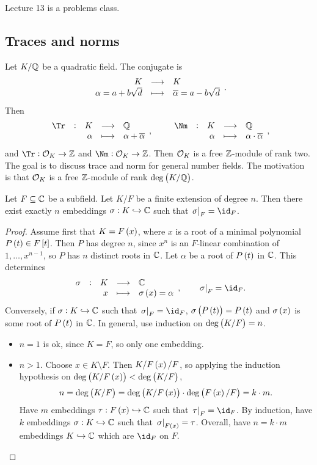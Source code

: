 
Lecture 13 is a problems class.

\subsection{Traces and norms}


Let $ K / \mathbb{Q} $ be a quadratic field. The conjugate is
$$ \function{K}{K}{\alpha = a + b\sqrt{d}}{\overline{\alpha} = a - b\sqrt{d}}. $$
Then
$$ \function[\Tr]{K}{\QQ}{\alpha}{\alpha + \overline{\alpha}}, \qquad \function[\Nm]{K}{\QQ}{\alpha}{\alpha \cdot \overline{\alpha}}, $$
and $ \Tr : \OOO_K \to \ZZ $ and $ \Nm : \OOO_K \to \ZZ $. Then $ \mathcal{O}_K $ is a free $ \mathbb{Z} $-module of rank two. The goal is to discuss trace and norm for general number fields. The motivation is that $ \mathcal{O}_K $ is a free $ \mathbb{Z} $-module of rank $ \deg \br{K / \QQ} $.

\pagebreak

\begin{proposition}
\label{prop:embeddings}
Let $ F \subseteq \mathbb{C} $ be a subfield. Let $ K / F $ be a finite extension of degree $ n $. Then there exist exactly $ n $ embeddings $ \sigma : K \hookrightarrow \mathbb{C} $ such that $ \eval{\sigma}_F = \id_F $.
\end{proposition}

\begin{proof}
Assume first that $ K = F\br{x} $, where $ x $ is a root of a minimal polynomial $ P\br{t} \in F\sbr{t} $. Then $ P $ has degree $ n $, since $ x^n $ is an $ F $-linear combination of $ 1, \dots, x^{n - 1} $, so $ P $ has $ n $ distinct roots in $ \mathbb{C} $. Let $ \alpha $ be a root of $ P\br{t} $ in $ \mathbb{C} $. This determines
$$ \function[\sigma]{K}{\CC}{x}{\sigma\br{x} = \alpha}, \qquad \eval{\sigma}_F = \id_F. $$
Conversely, if $ \sigma : K \hookrightarrow \mathbb{C} $ such that $ \eval{\sigma}_F = \id_F $, $ \sigma\br{P\br{t}} = P\br{t} $ and $ \sigma\br{x} $ is some root of $ P\br{t} $ in $ \mathbb{C} $. In general, use induction on $ \deg \br{K / F} = n $.
\begin{itemize}
\item $ n = 1 $ is ok, since $ K = F $, so only one embedding.
\item $ n > 1 $. Choose $ x \in K \setminus F $. Then $ K / F\br{x} / F $, so applying the induction hypothesis on $ \deg \br{K / F\br{x}} < \deg \br{K / F} $,
$$ n = \deg \br{K / F} = \deg \br{K / F\br{x}} \cdot \deg \br{F\br{x} / F} = k \cdot m. $$
Have $ m $ embeddings $ \tau : F\br{x} \hookrightarrow \CC $ such that $ \eval{\tau}_F = \id_F $. By induction, have $ k $ embeddings $ \sigma : K \hookrightarrow \mathbb{C} $ such that $ \eval{\sigma}_{F\br{x}} = \tau $. Overall, have $ n = k \cdot m $ embeddings $ K \hookrightarrow \mathbb{C} $ which are $ \id_F $ on $ F $.
\end{itemize}
\end{proof}


